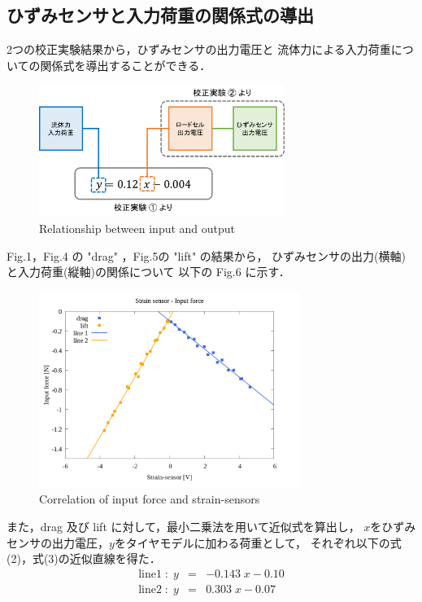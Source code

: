 \documentclass[twocolumn,a4j]{jsarticle}
\begin{document}
\subsection{ひずみセンサと入力荷重の関係式の導出}
2つの校正実験結果から，ひずみセンサの出力電圧と
流体力による入力荷重についての関係式を導出することができる．\\
\begin{figure}[htbp]
    \footnotesize
    \begin{center}
        \includegraphics[width=80mm]{../images/image_03.png}
        \caption{Relationship between input and output}
    \end{center}
\end{figure}

Fig.1，Fig.4 の "drag" ，Fig.5の "lift" の結果から，
ひずみセンサの出力(横軸)と入力荷重(縦軸)の関係について
以下の Fig.6 に示す．\par
\begin{figure}[htbp]
    \footnotesize
    \begin{center}
        \includegraphics[width=85mm]{../images/08_strainsensor-forces&line.png}
        \caption{Correlation of input force and strain-sensors}
    \end{center}
\end{figure}
また，drag 及び lift に対して，最小二乗法を用いて近似式を算出し，
$x$をひずみセンサの出力電圧，$y$をタイヤモデルに加わる荷重として，
それぞれ以下の式(2)，式(3)の近似直線を得た．
\begin{eqnarray}
    \mathrm{line 1} \; : \; y &=& -0.143 \; x - 0.10\\
    \mathrm{line 2} \; : \; y &=& 0.303 \; x - 0.07
\end{eqnarray}
\end{document}
